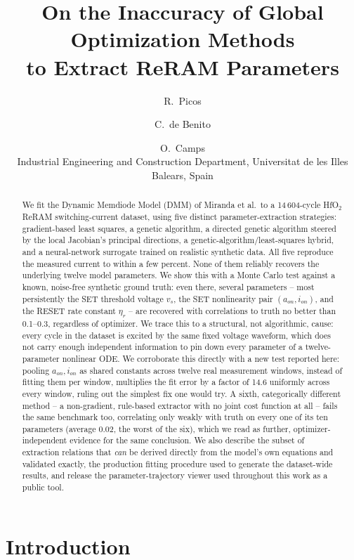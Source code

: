 \documentclass[11pt]{article}
\title{On the Inaccuracy of Global Optimization Methods\\ to Extract ReRAM Parameters}
\author{
  R.~Picos \and C.~de Benito \and O.~Camps \\[0.3em]
  \small Industrial Engineering and Construction Department, Universitat de les Illes Balears, Spain
}
\date{}
\begin{document}
\maketitle

\begin{abstract}
We fit the Dynamic Memdiode Model (DMM) of Miranda et al.\ to a 14\,604-cycle
HfO$_2$ ReRAM switching-current dataset, using five distinct parameter-extraction
strategies: gradient-based least squares, a genetic algorithm, a directed
genetic algorithm steered by the local Jacobian's principal directions, a
genetic-algorithm/least-squares hybrid, and a neural-network surrogate trained
on realistic synthetic data. All five reproduce the measured current to within
a few percent. None of them reliably recovers the underlying twelve model
parameters. We show this with a Monte Carlo test against a known, noise-free
synthetic ground truth: even there, several parameters -- most persistently
the SET threshold voltage $v_s$, the SET nonlinearity pair $(a_{on}, i_{on})$,
and the RESET rate constant $\eta_r$ -- are recovered with correlations to
truth no better than 0.1--0.3, regardless of optimizer. We trace this to a
structural, not algorithmic, cause: every cycle in the dataset is excited by
the same fixed voltage waveform, which does not carry enough independent
information to pin down every parameter of a twelve-parameter nonlinear ODE.
We corroborate this directly with a new test reported here: pooling
$a_{on}, i_{on}$ as shared constants across twelve real measurement windows,
instead of fitting them per window, multiplies the fit error by a factor of
14.6 uniformly across every window, ruling out the simplest fix one would
try. A sixth, categorically different method -- a non-gradient, rule-based
extractor with no joint cost function at all -- fails the same benchmark
too, correlating only weakly with truth on every one of its ten
parameters (average $0.02$, the worst of the six), which we read as
further, optimizer-independent evidence for the same conclusion. We also
describe the subset of extraction relations that \emph{can} be
derived directly from the model's own equations and validated exactly, the
production fitting procedure used to generate the dataset-wide results, and
release the parameter-trajectory viewer used throughout this work as a public
tool.
\end{abstract}

\section{Introduction}
\end{document}
